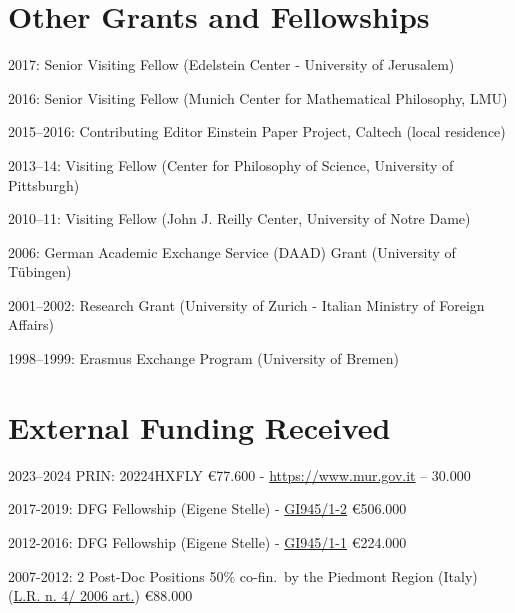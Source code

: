 \documentclass{article}
\renewenvironment{itemize}{
  \begin{list}{}{
    \setlength{\leftmargin}{1.5em}
  }
}{
  \end{list}
}
\begin{document}
\section*{Other Grants and Fellowships}

\begin{itemize}
\item 2017: Senior Visiting Fellow (Edelstein Center - University of Jerusalem)
\item 2016: Senior Visiting Fellow (Munich Center for Mathematical Philosophy, LMU)
\item 2015--2016: Contributing Editor Einstein Paper Project, Caltech (local residence)
\item 2013--14: Visiting Fellow (Center for Philosophy of Science, University of Pittsburgh)
\item 2010--11: Visiting Fellow (John J. Reilly Center, University of Notre Dame)
\item 2006: German Academic Exchange Service (DAAD) Grant (University of T\"ubingen)
\item 2001--2002: Research Grant (University of Zurich - Italian Ministry of Foreign Affairs)
\item 1998--1999: Erasmus Exchange Program (University of Bremen)
\end{itemize}


\section*{External Funding Received}

\begin{itemize}
\item 2023--2024 PRIN: 20224HXFLY \euro{77.600} - \href{https://www.mur.gov.it/sites/default/files/2023-06/Decreto\%20Direttoriale\%20n.\%20901\%20SH4_AllegatoA.pdf}{https://www.mur.gov.it} -- 30.000
\item 2017-2019: DFG Fellowship (Eigene Stelle) - \href{http://gepris.dfg.de/gepris/projekt/218862409}{GI945/1-2} \euro{506.000}
\item 2012-2016: DFG Fellowship (Eigene Stelle) - \href{http://gepris.dfg.de/gepris/projekt/218862409}{GI945/1-1} \euro{224.000}
\item 2007-2012: 2 Post-Doc Positions 50\% co-fin.\ by the Piedmont Region (Italy) (\href{http://arianna.consiglioregionale.piemonte.it/base/coord/c2006004.html}{L.R. n. 4/ 2006 art.}) \euro{88.000}

\end{itemize}
\end{document}
